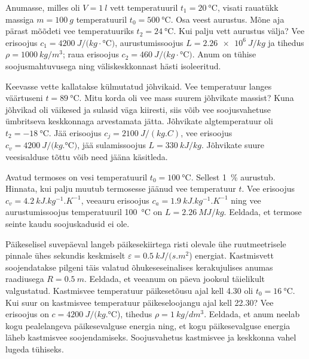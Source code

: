 \documentclass[10pt, twoside]{article}
\begin{document}
{
Anumasse, milles oli $V=\SI{1}{l}$ vett temperatuuril $t_1=\SI{20}{\degreeCelsius}$,
visati rauatükk massiga $m=\SI{100}{g}$ temperatuuril $t_0=\SI{500}{\degreeCelsius}$. Osa
veest aurustus. Mõne aja pärast mõõdeti vee temperatuuriks
$t_2=\SI{24}{\degreeCelsius}$. Kui palju vett aurustus välja? Vee erisoojus
$c_1=\SI{4200}{J/(kg\cdot\degreeCelsius)}$, aurustumissoojus $L=\SI{2,26 e6}{J/kg}$ ja
tihedus $\rho=\SI{1000}{kg/m^3}$; raua
erisoojus $c_2=\SI{460}{J/(kg\cdot\degreeCelsius)}$. Anum on tühise soojusmahtuvusega ning väliskeskkonnast
hästi isoleeritud.
\probend
\bigskip


Keevasse vette kallatakse külmutatud jõhvikaid. Vee temperatuur langes väärtuseni $t=\SI{89}{\degreeCelsius}$.
Mitu korda oli vee mass suurem jõhvikate massist? Kuna jõhvikad oli väikesed ja sulasid väga kiiresti, siis
võib vee soojusvahetuse ümbritseva keskkonnaga arvestamata jätta. Jõhvikate algtemperatuur oli
$t_2=\SI{-18}{\degreeCelsius}$. Jää erisoojus $c_j=\SI{2100}{J/(kg.C)}$, vee erisoojus $c_v=\SI{4200}{J/(kg.\degreeCelsius)}$, jää sulamissoojus $L=\SI{330}{kJ/kg}$. Jõhvikate suure veesisalduse tõttu võib need jääna käsitleda.
\probend
\bigskip


Avatud termoses on vesi temperatuuril $t_0 = \SI{100}{\degreeCelsius}$. Sellest \SI{1}{\%}
aurustub. Hinnata, kui palju muutub termosesse jäänud vee temperatuur $t$.
Vee erisoojus $c_v = \SI{4,2}{kJ.kg^{-1}.K^{-1}}$, veeauru erisoojus $c_a = \SI{1,9}{kJ.kg^{-1}.K^{-1}}$ ning
vee aurustumissoojus temperatuuril \SI{100}{\degreeCelsius} on $L = \SI{2,26}{MJ/kg}$. Eeldada, et termose seinte kaudu soojuskadusid ei ole.
\probend
\bigskip


Päikeselisel suvepäeval langeb päikesekiirtega risti olevale ühe ruutmeetrisele pinnale ühes sekundis keskmiselt $\varepsilon = \SI{0,5}{kJ/(s.m^2}$) energiat. Kastmisvett soojendatakse pilgeni täis valatud õhukeseseinalises kerakujulises anumas raadiusega $R = \SI{0,5}{m}$. Eeldada, et veeanum on päeva jooksul täielikult valgustatud. Kastmisvee temperatuur päikesetõusu ajal kell 4.30 oli $t_0 = \SI{16}{\degreeCelsius}$. Kui suur on kastmisvee temperatuur päikeseloojangu ajal kell 22.30? Vee erisoojus on $c = \SI{4200}{J/(kg.\degreeCelsius}$), tihedus $\rho = \SI{1}{kg/dm^3}$. Eeldada, et anum neelab kogu pealelangeva päikesevalguse energia ning, et kogu päikesevalguse energia läheb kastmisvee soojendamiseks. Soojusvahetus kastmisvee ja keskkonna vahel lugeda tühiseks.
\probend
\bigskip

}
\end{document}
